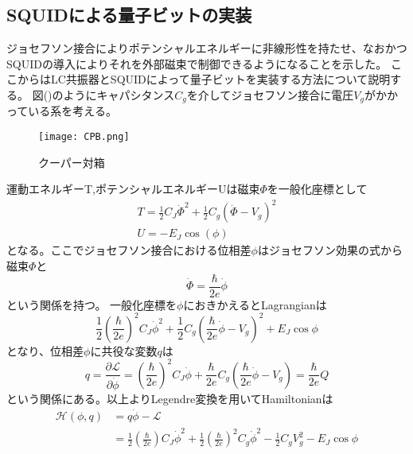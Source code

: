         \subsection{SQUIDによる量子ビットの実装}
        ジョセフソン接合によりポテンシャルエネルギーに非線形性を持たせ、なおかつSQUIDの導入によりそれを外部磁束で制御できるようになることを示した。
        ここからはLC共振器とSQUIDによって量子ビットを実装する方法について説明する。
        図()のようにキャパシタンス$C_g$を介してジョセフソン接合に電圧$V_g$がかかっている系を考える。
        \begin{figure}[H]
            \begin{center}
                \texttt{[image: CPB.png]}
                \caption{クーパー対箱}
            \end{center}
        \end{figure}
        運動エネルギーT,ポテンシャルエネルギーUは磁束$\Phi$を一般化座標として
        \begin{eqnarray}
            T=\frac{1}{2}C_J\dot{\Phi}^2+\frac{1}{2}C_g(\dot{\Phi}-V_g)^2\\
            U=-E_J\cos(\phi)
        \end{eqnarray}
        となる。ここでジョセフソン接合における位相差$\phi$はジョセフソン効果の式から磁束$\Phi$と
        \begin{equation}
            \dot{\Phi}=\frac{\hbar}{2e}\dot{\phi}
        \end{equation}
        という関係を持つ。
        一般化座標を$\phi$におきかえるとLagrangianは
        \begin{equation}
            \frac{1}{2}\left(\frac{\hbar}{2 e}\right)^{2} C_{J} \dot{\phi}^{2}+\frac{1}{2} C_{g}\left(\frac{\hbar}{2 e} \dot{\phi}-V_{g}\right)^{2}+E_{J} \cos \phi
        \end{equation}
        となり、位相差$\phi$に共役な変数$q$は
        \begin{equation}
            q=\frac{\partial \mathcal{L}}{\partial \dot{\phi}}=\left(\frac{\hbar}{2 e}\right)^{2} C_{J} \dot{\phi}+\frac{\hbar}{2 e} C_{g}\left(\frac{\hbar}{2 e} \dot{\phi}-V_{g}\right)=\frac{\hbar}{2 e} Q
        \end{equation}
        という関係にある。以上よりLegendre変換を用いてHamiltonianは
        \begin{equation}
        \begin{split}
            \mathcal{H}(\phi, q)
            &=q \dot{\phi}-\mathcal{L}\\
            &=\frac{1}{2}\left(\frac{\hbar}{2 e}\right)C_{J} \dot{\phi}^{2}+\frac{1}{2}\left(\frac{\hbar}{2 e}\right)^{2} C_{g} \dot{\phi}^{2}-\frac{1}{2} C_{g} V_{g}^{2}-E_{J} \cos \phi
        \end{split}
        \end{equation}
